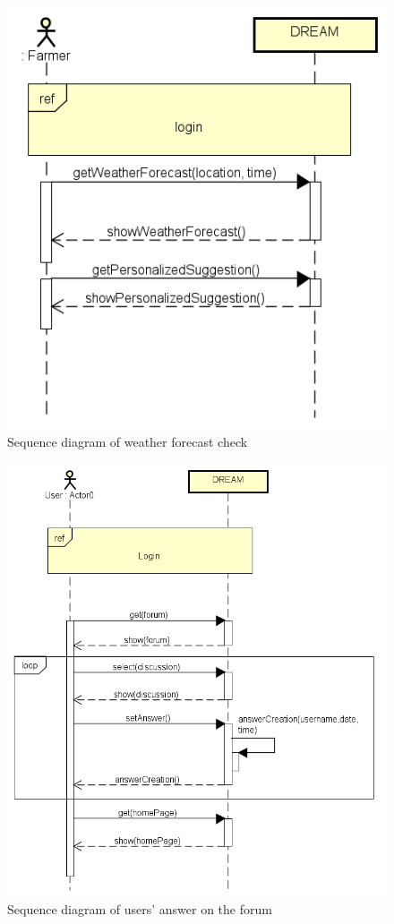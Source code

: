 \bigskip
\begin{figure}[H]
    \centering
    \includegraphics[scale=0.7]{Images/ChecksWeatherForecastSequence.png}
    \caption{Sequence diagram of weather forecast check}
\end{figure}

\bigskip
\begin{figure}[H]
    \centering
    \includegraphics[scale=0.7]{Images/userAnswersForumDiscussion.png}
    \caption{Sequence diagram of users' answer on the forum}
\end{figure}


